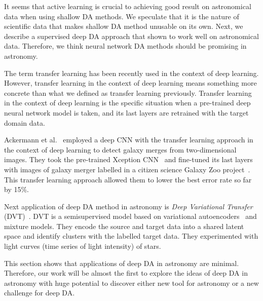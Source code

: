 It seems that active learning is crucial
to achieving good result on astronomical data when using shallow DA methods.
We speculate that it is the nature of scientific data
that makes shallow DA method unusable on its own.
Next, we describe a supervised deep DA  approach
that shown to work well on astronomical data.
Therefore, we think neural network DA methods should be promising in astronomy.

The term transfer learning has been recently used in the context of deep learning.
However, transfer learning in the context of deep learning means something more concrete than what we defined as transfer learning previously.
Transfer learning in the context of deep learning is the specific situation
when a pre-trained deep neural network model is taken,
and its last layers are retrained with the target domain data.

Ackermann et al.~\cite{ackermann2018} employed a deep CNN
with the transfer learning approach
in the context of deep learning to detect galaxy merges
from two-dimensional images.
They took the pre-trained Xception CNN~\cite{chollet2017}
and fine-tuned its last layers with images of galaxy merger labelled
in a citizen science Galaxy Zoo project~\cite{lintott2010}.
This transfer learning approach allowed them to lower the best error rate so far by 15\%.

Next application of deep DA method in astronomy is \textit{Deep Variational Transfer} (DVT)~\cite{belhaj2018}.
DVT is a semisupervised model based on variational autoencoders~\cite{kingma2014a} and mixture models.
They encode the source and target data into a shared latent space
and identify clusters with the labelled target data.
They experimented with light curves (time series of light intensity) of stars.

This section shows that applications of deep DA in astronomy are minimal.
Therefore, our work will be almost the first to explore the ideas
of deep DA in astronomy with huge potential to discover
either new tool for astronomy or a new challenge for deep DA.
